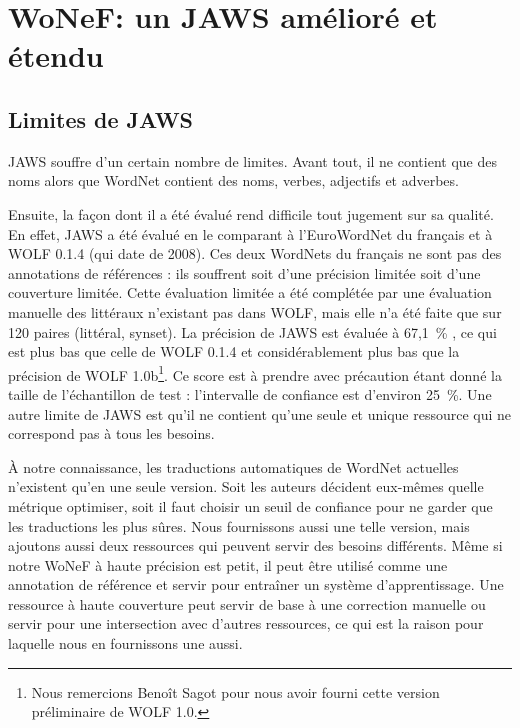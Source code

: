 \section{WoNeF: un JAWS amélioré et étendu}
\label{sec:improving_jaws}

\subsection{Limites de JAWS}
\label{subsec:limitations}

JAWS souffre d'un certain nombre de limites. Avant tout, il ne contient que des
noms alors que WordNet contient des noms, verbes, adjectifs et adverbes.

Ensuite, la façon dont il a été évalué rend difficile tout jugement sur sa
qualité. En effet, JAWS a été évalué en le comparant à l'EuroWordNet du
français et à WOLF 0.1.4 (qui date de 2008). Ces deux WordNets du français ne
sont pas des annotations de références : ils souffrent soit d'une précision
limitée soit d'une couverture limitée. Cette évaluation limitée a été complétée
par une évaluation manuelle des littéraux n'existant pas dans WOLF, mais elle
n'a été faite que sur 120 paires (littéral, synset). La précision de JAWS est
évaluée à 67,1~\% \citep{mouton2010phd}, ce qui est plus bas que celle de WOLF
0.1.4 et considérablement plus bas que la précision de WOLF 1.0b\footnote{Nous
remercions Benoît Sagot pour nous avoir fourni cette version préliminaire de
WOLF 1.0.}. Ce score est à prendre avec précaution étant donné la taille de
l'échantillon de test : l'intervalle de confiance est d'environ 25~\%. Une
autre limite de JAWS est qu'il ne contient qu'une seule et unique ressource qui
ne correspond pas à tous les besoins.


À notre connaissance, les traductions automatiques de WordNet actuelles
n'existent qu'en une seule version. Soit les auteurs décident eux-mêmes quelle
métrique optimiser, soit il faut choisir un seuil de confiance pour ne garder
que les traductions les plus sûres. Nous fournissons aussi une telle version,
mais ajoutons aussi deux ressources qui peuvent servir des besoins différents.
Même si notre WoNeF à haute précision est petit, il peut être utilisé comme une
annotation de référence et servir pour entraîner un système d'apprentissage.
Une ressource à haute couverture peut servir de base à une correction manuelle
ou servir pour une intersection avec d'autres ressources, ce qui est la raison
pour laquelle nous en fournissons une aussi.


